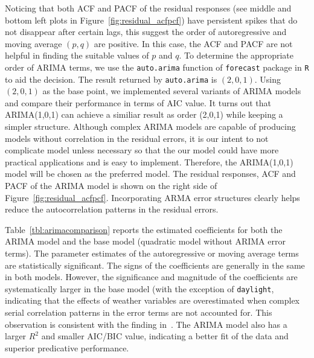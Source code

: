 \documentclass [11pt, proquest] {uwthesis}[2015/03/03]
\begin{document}
Noticing that both ACF and PACF of the residual responses (see middle and bottom left plots in Figure~\ref{fig:residual_acfpcf}) have persistent spikes that do not disappear after certain lags, this suggest the order of autoregressive and moving average $(p,q)$ are positive. In this case, the ACF and PACF are not helpful in finding the suitable values of $p$ and $q$. To determine the appropriate order of ARIMA terms, we use the \texttt{auto.arima} function of \texttt{forecast} package in \texttt{R} to aid the decision. The result returned by \texttt{auto.arima} is $(2,0,1)$. Using $(2,0,1)$ as the base point, we implemented several variants of ARIMA models and compare their performance in terms of AIC value. It turns out that ARIMA(1,0,1) can achieve a similiar result as order (2,0,1) while keeping a simpler structure. Although complex ARIMA models are capable of producing models without correlation in the residual errors, it is our intent to not complicate model unless necessary so that the our model could have more practical applications and is easy to implement. Therefore, the ARIMA(1,0,1) model will be chosen as the preferred model. The residual responses, ACF and PACF of the ARIMA model is shown on the right side of Figure~\ref{fig:residual_acfpcf}. Incorporating ARMA error structures clearly helps reduce the autocorrelation patterns in the residual errors.
 
Table~\ref{tbl:arimacomparison} reports the estimated coefficients for both the ARIMA model and the base model (quadratic model without ARIMA error terms). The parameter estimates of the autoregressive or moving average terms are statistically significant. The signs of the coefficients are generally in the same in both models. However, the significance and magnitude of the coefficients are systematically larger in the base model (with the exception of \texttt{daylight}, indicating that the effects of weather variables are overestimated when complex serial correlation patterns in the error terms are not accounted for. This observation is consistent with the finding in~\cite{Gallop:2012aa}. The ARIMA model also has a larger $R^2$ and smaller AIC/BIC value, indicating a better fit of the data and superior predicative performance. 
\end{document}
